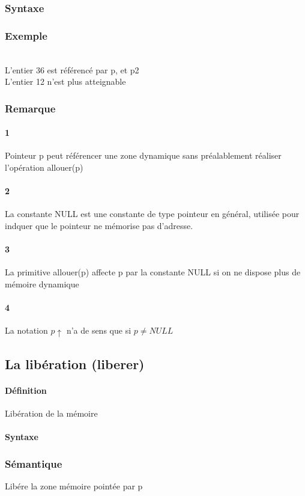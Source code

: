 		\subsubsection{Syntaxe}
			
		 \subsubsection{Exemple}
			
			
			
			\\
			L'entier 36 est référencé par p, et p2\\
			L'entier 12 n'est plus atteignable	
			\subsubsection{Remarque}
				\paragraph{1}
					Pointeur p peut référencer une zone dynamique sans préalablement réaliser l'opération allouer(p)
				\paragraph{2}
					La constante NULL est une constante de type pointeur en général, utilisée pour indquer que le pointeur ne mémorise pas d'adresse.
				\paragraph{3}
					La primitive allouer(p) affecte p par la constante NULL si on ne dispose plus de mémoire dynamique
				\paragraph{4}
					La notation $p\uparrow$ n'a de sens que si $p \ne NULL$
	\subsection{La libération (liberer)}
		\paragraph{Définition}
			Libération de la mémoire
		\paragraph{Syntaxe}
			
		\subsubsection{Sémantique}
			Libére la zone mémoire pointée par p
